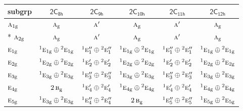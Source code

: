\documentclass[10pt,a4paper]{article}
\numberwithin{equation}{section}
\newcommand{\grp}[1]{\mathsf{#1}}
\newcommand{\irr}[1]{\text{\normalfont\scshape #1}}
\newcommand{\conjpair}[1]{{}^{#1}}
\newcommand{\ptag}[1]{\mathrm{#1}}
\begin{document}
{\small\begin{longtable}{@{}lccccc@{}}\toprule
subgrp & \href{2C8h.pdf}{$\grp{2C_{8h}}$} & \href{2C9h.pdf}{$\grp{2C_{9h}}$} & \href{2C10h.pdf}{$\grp{2C_{10h}}$} & \href{2C11h.pdf}{$\grp{2C_{11h}}$} & \href{2C12h.pdf}{$\grp{2C_{12h}}$}\\\midrule\endhead
\bottomrule\endfoot\endlastfoot
$\irr{a}_{1\ptag{g}}$ & $\irr{a}_{\ptag{g}}$ & $\irr{a}'$ & $\irr{a}_{\ptag{g}}$ & $\irr{a}'$ & $\irr{a}_{\ptag{g}}$\\*
$\irr{a}_{2\ptag{g}}$ & $\irr{a}_{\ptag{g}}$ & $\irr{a}'$ & $\irr{a}_{\ptag{g}}$ & $\irr{a}'$ & $\irr{a}_{\ptag{g}}$\\
$\irr{e}_{1\ptag{g}}$ & $\conjpair{1}\irr{e}_{1\ptag{g}}\oplus \conjpair{2}\irr{e}_{1\ptag{g}}$ & $\conjpair{1}\irr{e}_{1}''\oplus \conjpair{2}\irr{e}_{1}''$ & $\conjpair{1}\irr{e}_{1\ptag{g}}\oplus \conjpair{2}\irr{e}_{1\ptag{g}}$ & $\conjpair{1}\irr{e}_{1}''\oplus \conjpair{2}\irr{e}_{1}''$ & $\conjpair{1}\irr{e}_{1\ptag{g}}\oplus \conjpair{2}\irr{e}_{1\ptag{g}}$\\
$\irr{e}_{2\ptag{g}}$ & $\conjpair{1}\irr{e}_{2\ptag{g}}\oplus \conjpair{2}\irr{e}_{2\ptag{g}}$ & $\conjpair{1}\irr{e}_{2}'\oplus \conjpair{2}\irr{e}_{2}'$ & $\conjpair{1}\irr{e}_{2\ptag{g}}\oplus \conjpair{2}\irr{e}_{2\ptag{g}}$ & $\conjpair{1}\irr{e}_{2}'\oplus \conjpair{2}\irr{e}_{2}'$ & $\conjpair{1}\irr{e}_{2\ptag{g}}\oplus \conjpair{2}\irr{e}_{2\ptag{g}}$\\
$\irr{e}_{3\ptag{g}}$ & $\conjpair{1}\irr{e}_{3\ptag{g}}\oplus \conjpair{2}\irr{e}_{3\ptag{g}}$ & $\conjpair{1}\irr{e}_{3}''\oplus \conjpair{2}\irr{e}_{3}''$ & $\conjpair{1}\irr{e}_{3\ptag{g}}\oplus \conjpair{2}\irr{e}_{3\ptag{g}}$ & $\conjpair{1}\irr{e}_{3}''\oplus \conjpair{2}\irr{e}_{3}''$ & $\conjpair{1}\irr{e}_{3\ptag{g}}\oplus \conjpair{2}\irr{e}_{3\ptag{g}}$\\
$\irr{e}_{4\ptag{g}}$ & $2\,\irr{b}_{\ptag{g}}$ & $\conjpair{1}\irr{e}_{4}'\oplus \conjpair{2}\irr{e}_{4}'$ & $\conjpair{1}\irr{e}_{4\ptag{g}}\oplus \conjpair{2}\irr{e}_{4\ptag{g}}$ & $\conjpair{1}\irr{e}_{4}'\oplus \conjpair{2}\irr{e}_{4}'$ & $\conjpair{1}\irr{e}_{4\ptag{g}}\oplus \conjpair{2}\irr{e}_{4\ptag{g}}$\\
$\irr{e}_{5\ptag{g}}$ & $\conjpair{1}\irr{e}_{3\ptag{g}}\oplus \conjpair{2}\irr{e}_{3\ptag{g}}$ & $\conjpair{1}\irr{e}_{4}''\oplus \conjpair{2}\irr{e}_{4}''$ & $2\,\irr{b}_{\ptag{g}}$ & $\conjpair{1}\irr{e}_{5}''\oplus \conjpair{2}\irr{e}_{5}''$ & $\conjpair{1}\irr{e}_{5\ptag{g}}\oplus \conjpair{2}\irr{e}_{5\ptag{g}}$\\

\end{longtable}}
\end{document}
